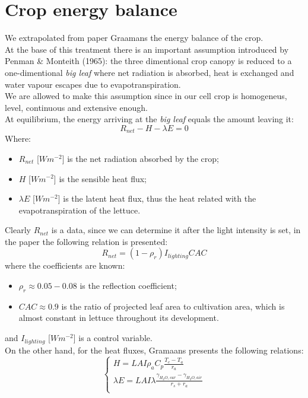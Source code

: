 \section{Crop energy balance}
We extrapolated from paper Graamans the energy balance of the crop.\\
At the base of this treatment there is an important assumption introduced by Penman \& Monteith (1965): the three dimentional crop canopy is reduced to a one-dimentional \emph{big leaf} where net radiation is absorbed, heat is exchanged and water vapour escapes due to evapotranspiration.\\
We are allowed to make this assumption since in our cell crop is homogeneus, level, continuous and extensive enough.\\
At equilibrium, the energy arriving at the \emph{big leaf} equals the amount leaving it:
\begin{equation}	\label{crop energy balance}
	R_{net} - H - \lambda E = 0
\end{equation}
Where:
\begin{itemize}
	\item $R_{net}$ [$Wm^{-2}$] is the net radiation absorbed by the crop;
	\item $H$ [$Wm^{-2}$] is the sensible heat flux;
	\item $\lambda E$ [$Wm^{-2}$] is the latent heat flux, thus the heat related with the evapotranspiration of the lettuce.
\end{itemize}
Clearly $R_{net}$ is a data, since we can determine it after the light intensity is set, in the paper the following relation is presented:
\begin{equation}	\label{R_net}
	R_{net} = (1-\rho_r)I_{lighting}CAC
\end{equation}
where the coefficients are known:
\begin{itemize}
	\item $\rho_r \approx{0.05 - 0.08}$ is the reflection coefficient;
	\item $CAC \approx{0.9}$ is the ratio of projected leaf area to cultivation area, which is almost constant in lettuce throughout its development.
\end{itemize}
and $I_{lighting}$ [$Wm^{-2}$] is a control variable.\\
On the other hand, for the heat fluxes, Gramaans presents the following relations:
\begin{equation}	\label{heat fluxes}
	\begin{cases}
		H = LAI \rho_a C_p \frac{T_c - T_a}{r_a}\\
		\lambda E = LAI \lambda \frac{\gamma_{H_2O,sur} - \gamma_{H_2O,air}}{r_s + r_a}\\
	\end{cases}
\end{equation}
